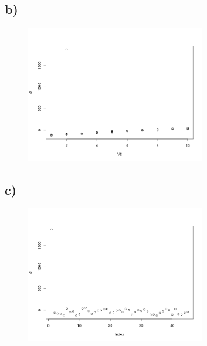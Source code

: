 \documentclass[9pt]{article}  %
\begin{document}
  \subsection{b)}
      \begin{figure}[H]
      \centering
      \includegraphics[width=0.7\textwidth]{6b.png}
      \caption {}
    \end{figure} 
    
  \subsection{c)}

      \begin{figure}[H]
      \centering
      \includegraphics[width=0.7\textwidth]{6c.png}
      \caption {}
    \end{figure} 
\end{document}
